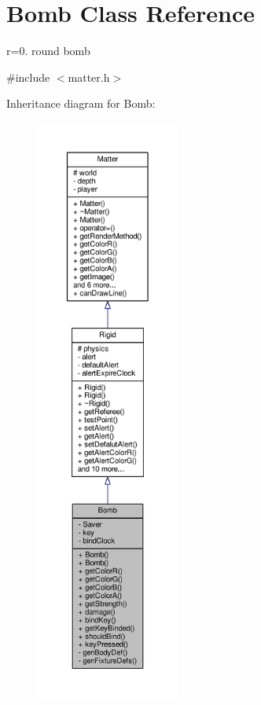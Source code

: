 \hypertarget{classBomb}{}\section{Bomb Class Reference}
\label{classBomb}


r=0. round bomb  




{\ttfamily \#include $<$matter.\+h$>$}



Inheritance diagram for Bomb\+:
\nopagebreak
\begin{figure}[H]
\begin{center}
\leavevmode
\includegraphics[height=550pt]{classBomb__inherit__graph}
\end{center}
\end{figure}


